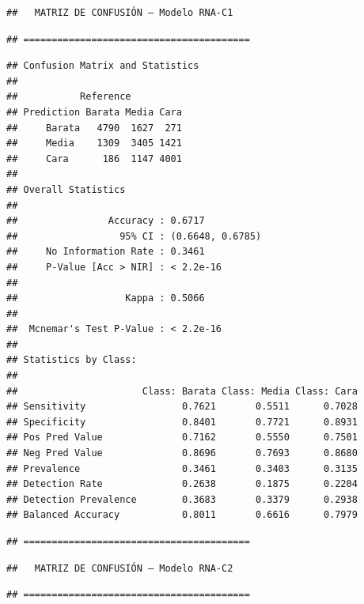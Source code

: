 \documentclass[
]{article}
\begin{document}
\begin{verbatim}
##   MATRIZ DE CONFUSIÓN – Modelo RNA-C1
\end{verbatim}

\begin{verbatim}
## ========================================
\end{verbatim}

\begin{verbatim}
## Confusion Matrix and Statistics
## 
##           Reference
## Prediction Barata Media Cara
##     Barata   4790  1627  271
##     Media    1309  3405 1421
##     Cara      186  1147 4001
## 
## Overall Statistics
##                                           
##                Accuracy : 0.6717          
##                  95% CI : (0.6648, 0.6785)
##     No Information Rate : 0.3461          
##     P-Value [Acc > NIR] : < 2.2e-16       
##                                           
##                   Kappa : 0.5066          
##                                           
##  Mcnemar's Test P-Value : < 2.2e-16       
## 
## Statistics by Class:
## 
##                      Class: Barata Class: Media Class: Cara
## Sensitivity                 0.7621       0.5511      0.7028
## Specificity                 0.8401       0.7721      0.8931
## Pos Pred Value              0.7162       0.5550      0.7501
## Neg Pred Value              0.8696       0.7693      0.8680
## Prevalence                  0.3461       0.3403      0.3135
## Detection Rate              0.2638       0.1875      0.2204
## Detection Prevalence        0.3683       0.3379      0.2938
## Balanced Accuracy           0.8011       0.6616      0.7979
\end{verbatim}

\begin{verbatim}
## ========================================
\end{verbatim}

\begin{verbatim}
##   MATRIZ DE CONFUSIÓN – Modelo RNA-C2
\end{verbatim}

\begin{verbatim}
## ========================================
\end{verbatim}
\end{document}
